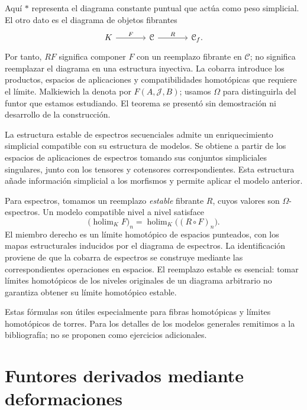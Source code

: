 Aquí $*$ representa el diagrama constante puntual que actúa como peso simplicial. El otro dato es el diagrama de objetos fibrantes
\[
\begin{tikzcd}[column sep=large]
K\arrow[r,"F"]&\mathcal C\arrow[r,"R"]&\mathcal C_f.
\end{tikzcd}
\]
Por tanto, $RF$ significa componer $F$ con un reemplazo fibrante en $\mathcal C$; no significa reemplazar el diagrama en una estructura inyectiva. La cobarra introduce los productos, espacios de aplicaciones y compatibilidades homotópicas que requiere el límite. Malkiewich la denota por $F(A,\mathcal J,B)$; usamos $\Omega$ para distinguirla del funtor que estamos estudiando. El teorema se presentó sin demostración ni desarrollo de la construcción.

La estructura estable de espectros secuenciales admite un enriquecimiento simplicial compatible con su estructura de modelos. Se obtiene a partir de los espacios de aplicaciones de espectros tomando sus conjuntos simpliciales singulares, junto con los tensores y cotensores correspondientes. Esta estructura añade información simplicial a los morfismos y permite aplicar el modelo anterior.

Para espectros, tomamos un reemplazo \emph{estable} fibrante $R$, cuyos valores son $\Omega$-espectros. Un modelo compatible nivel a nivel satisface
\[
\bigl(\operatorname{holim}_K F\bigr)_n
=\operatorname{holim}_K\bigl((R\circ F)_n\bigr).
\]
El miembro derecho es un límite homotópico de espacios punteados, con los mapas estructurales inducidos por el diagrama de espectros. La identificación proviene de que la cobarra de espectros se construye mediante las correspondientes operaciones en espacios. El reemplazo estable es esencial: tomar límites homotópicos de los niveles originales de un diagrama arbitrario no garantiza obtener su límite homotópico estable.

Estas fórmulas son útiles especialmente para fibras homotópicas y límites homotópicos de torres. Para los detalles de los modelos generales remitimos a la bibliografía; no se proponen como ejercicios adicionales.

\section{Funtores derivados mediante deformaciones}

